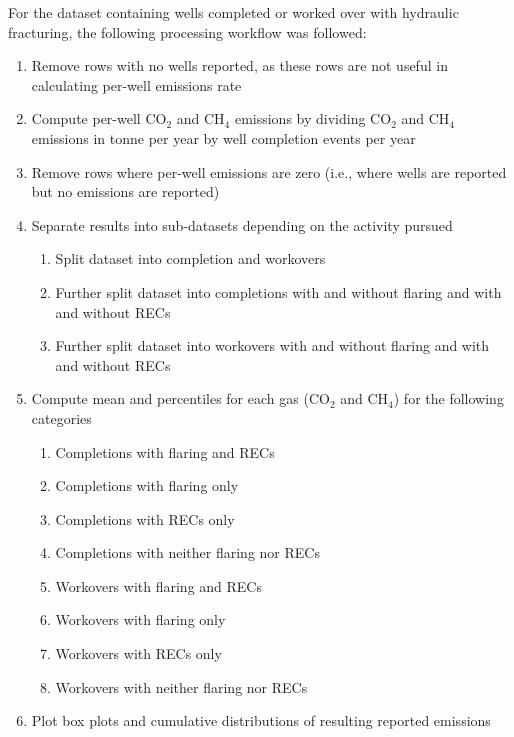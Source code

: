 \documentclass[11pt]{report}
\begin{document}
For the dataset containing wells completed or worked over with hydraulic fracturing, the following processing workflow was followed:
\begin{enumerate}
\item Remove rows with no wells reported, as these rows are not useful in calculating per-well emissions rate	
\item Compute per-well CO$_2$ and CH$_4$ emissions by dividing CO$_2$ and CH$_4$ emissions in tonne per year by well completion events per year	
\item Remove rows where per-well emissions are zero (i.e., where wells are reported but no emissions are reported)	
\item Separate results into sub-datasets depending on the activity pursued	
	\begin{enumerate}
	\item Split dataset into completion and workovers
	\item Further split dataset into completions with and without flaring and with and without RECs
	\item Further split dataset into workovers with and without flaring and with and without RECs
	\end{enumerate}
\item Compute mean and percentiles for each gas (CO$_2$ and CH$_4$) for the following categories	
	\begin{enumerate}
	\item Completions with flaring and RECs
	\item Completions with flaring only
	\item Completions with RECs only
	\item Completions with neither flaring nor RECs
	\item Workovers with flaring and RECs
	\item Workovers with flaring only
	\item Workovers with RECs only
	\item Workovers with neither flaring nor RECs
	\end{enumerate}
\item Plot box plots and cumulative distributions of resulting reported emissions	
\end{enumerate}
\end{document}
